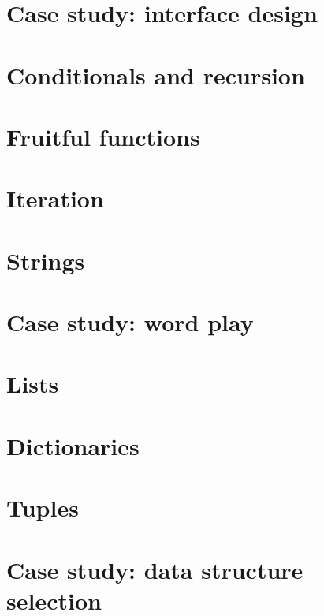 \documentclass[french,10pt]{book}
\newcommand{\EN}{\color{red} \normalsize}
\begin{document}
\chapter{Case study: interface design}
\label{turtlechap}

\EN
\chapter{Conditionals and recursion}

\EN
\chapter{Fruitful functions}
\label{fruitchap}

\EN
\chapter{Iteration}

\EN
\chapter{Strings}
\label{strings}

\EN
\chapter{Case study: word play}

\EN
\chapter{Lists}

\EN
\chapter{Dictionaries}

\EN
\chapter{Tuples}
\label{tuplechap}

\EN
\chapter{Case study: data structure selection}

\EN
\end{document}
